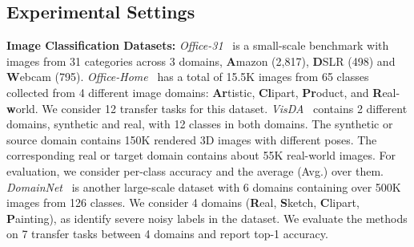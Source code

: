 \documentclass[10pt,twocolumn,letterpaper]{article}
\begin{document}
\subsection{Experimental Settings}
\noindent \textbf{Image Classification Datasets:} \emph{Office-31}~\cite{office31} is a small-scale benchmark with images from 31 categories across 3 domains, \textbf{A}mazon (2,817), \textbf{D}SLR (498) and \textbf{W}ebcam (795). \emph{Office-Home}~\cite{venkateswara2017deep} has a total of 15.5K images from 65 classes  collected from 4 different image domains: \textbf{Ar}tistic, \textbf{Cl}ipart, \textbf{Pr}oduct, and \textbf{R}eal-\textbf{w}orld. We consider 12 transfer tasks for this dataset. \emph{VisDA}~\cite{peng2017visda} contains 2 different domains, synthetic and real, with 12 classes in both domains. The synthetic or source domain contains 150K rendered 3D images with different poses. The corresponding real or target domain contains about 55K real-world images. For evaluation, we consider per-class accuracy and the average (Avg.) over them.  \emph{DomainNet}~\cite{peng2019moment} is another large-scale dataset with 6 domains containing over 500K images from 126 classes. We consider 4 domains (\textbf{R}eal, \textbf{S}ketch, \textbf{C}lipart, \textbf{P}ainting), as \cite{saito2019semi} identify severe noisy labels in the dataset. We evaluate the methods on 7 transfer tasks between 4 domains and report top-1 accuracy. 
\end{document}
